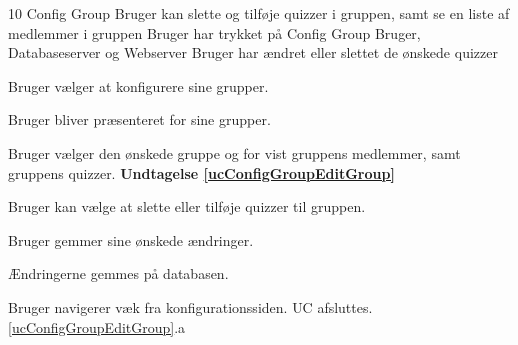 \uchead
	{10} %
	{Config Group} %
	{Bruger kan slette og tilføje quizzer i gruppen, samt se en liste af medlemmer i gruppen} %
	{Bruger har trykket på Config Group} %
	{Bruger, Databaseserver og Webserver} %
	{} %
	{} %
	{Bruger har ændret eller slettet de ønskede quizzer} %


\item Bruger vælger at konfigurere sine grupper.

\item Bruger bliver præsenteret for sine grupper.

\item\label{ucConfigGroupEditGroup} Bruger vælger den ønskede gruppe og for vist gruppens medlemmer, samt gruppens quizzer. \textbf{Undtagelse \ref{ucConfigGroupEditGroup}}

\item Bruger kan vælge at slette eller tilføje quizzer til gruppen.

\item Bruger gemmer sine ønskede ændringer.

\item Ændringerne gemmes på databasen.


\ucdescriptionend %

\ucextension
	{Bruger navigerer væk fra konfigurationssiden.}
	{UC afsluttes.}
	{\ref{ucConfigGroupEditGroup}.a}

